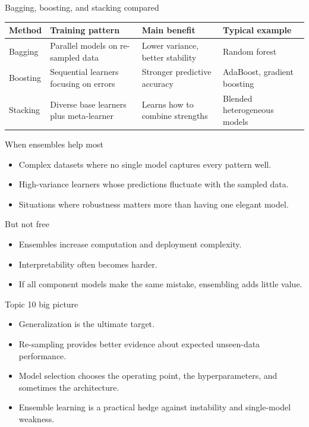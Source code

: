 \documentclass[12pt]{beamer}
\begin{document}
\begin{frame}{Bagging, boosting, and stacking compared}
  \scriptsize
  \renewcommand{\arraystretch}{1.2}
  \setlength{\tabcolsep}{4pt}
  \begin{tabular}{|p{1.8cm}|p{2.5cm}|p{2.7cm}|p{2.2cm}|}
    \hline
    Method & Training pattern & Main benefit & Typical example \\
    \hline
    Bagging & Parallel models on re-sampled data & Lower variance, better stability & Random forest \\
    \hline
    Boosting & Sequential learners focusing on errors & Stronger predictive accuracy & AdaBoost, gradient boosting \\
    \hline
    Stacking & Diverse base learners plus meta-learner & Learns how to combine strengths & Blended heterogeneous models \\
    \hline
  \end{tabular}
  \vspace{0.4em}
\end{frame}

\begin{frame}{When ensembles help most}
  \begin{itemize}
    \item Complex datasets where no single model captures every pattern well.
    \item High-variance learners whose predictions fluctuate with the sampled data.
    \item Situations where robustness matters more than having one elegant model.
  \end{itemize}
  \begin{warningbox}{But not free}
    \begin{itemize}
      \item Ensembles increase computation and deployment complexity.
      \item Interpretability often becomes harder.
      \item If all component models make the same mistake, ensembling adds little value.
    \end{itemize}
  \end{warningbox}
\end{frame}

\begin{frame}{Topic 10 big picture}
  \begin{itemize}
    \item Generalization is the ultimate target.
    \item Re-sampling provides better evidence about expected unseen-data performance.
    \item Model selection chooses the operating point, the hyperparameters, and sometimes the architecture.
    \item Ensemble learning is a practical hedge against instability and single-model weakness.
  \end{itemize}
\end{frame}
\end{document}
